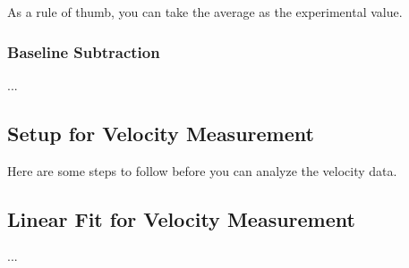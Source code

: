 As a rule of thumb, you can take the average as the experimental value.
\subsubsection{Baseline Subtraction}
...
\subsection{Setup for Velocity Measurement}
Here are some steps to follow before you can analyze the velocity data.
\subsection{Linear Fit for Velocity Measurement}
...
